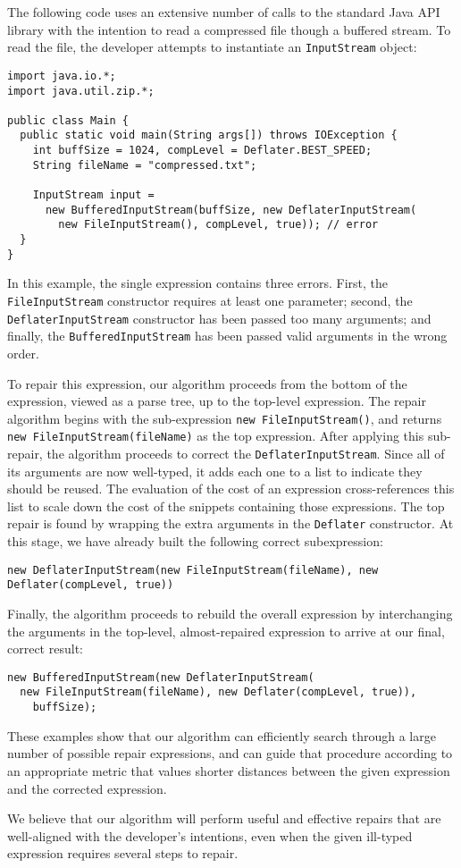 The following code uses an extensive number of calls to the standard Java API library with the intention to read a compressed file though a buffered stream. To read the file, the developer attempts to instantiate an \lstinline{InputStream} object:
\begin{lstlisting}
import java.io.*;
import java.util.zip.*;

public class Main {
  public static void main(String args[]) throws IOException {
    int buffSize = 1024, compLevel = Deflater.BEST_SPEED;
    String fileName = "compressed.txt";
    
    InputStream input = 
      new BufferedInputStream(buffSize, new DeflaterInputStream(
        new FileInputStream(), compLevel, true)); // error 
  }
}
\end{lstlisting}
In this example, the single expression contains three errors. First, the \lstinline{FileInputStream} constructor requires at least one parameter; second, the \lstinline{DeflaterInputStream} constructor has been passed too many arguments; and finally, the \lstinline{BufferedInputStream} has been passed valid arguments in the wrong order.

To repair this expression, our algorithm proceeds from the bottom of the expression, viewed as a parse tree, up to the top-level expression. The repair algorithm begins with the sub-expression \lstinline{new FileInputStream()}, and returns \lstinline{new FileInputStream(fileName)} as the top expression. After applying this sub-repair, the algorithm proceeds to correct the \lstinline{DeflaterInputStream}. Since all of its arguments are now well-typed, it adds each one to a list to indicate they should be reused. The evaluation of the cost of an expression cross-references this list to scale down the cost of the snippets containing those expressions. The top repair is found by wrapping the extra arguments in the \lstinline{Deflater} constructor. At this stage, we have already built the following correct subexpression:
\begin{lstlisting}
new DeflaterInputStream(new FileInputStream(fileName), new Deflater(compLevel, true))
\end{lstlisting}
Finally, the algorithm proceeds to rebuild the overall expression by interchanging the arguments in the top-level, almost-repaired expression to arrive at our final, correct result:
\begin{lstlisting}   
new BufferedInputStream(new DeflaterInputStream(
  new FileInputStream(fileName), new Deflater(compLevel, true)),
    buffSize);
\end{lstlisting}
These examples show that our algorithm can efficiently search through a large number of possible repair expressions, and can guide that procedure according to an appropriate metric that values shorter distances between the given expression and the corrected expression.

We believe that our algorithm will perform useful and effective repairs that are well-aligned with the developer's intentions, even when the given ill-typed expression requires several steps to repair.
